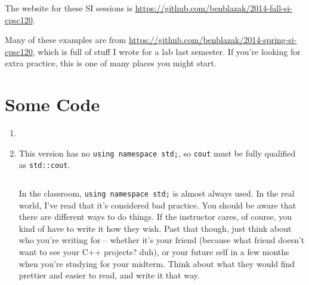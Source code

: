 \documentclass[12pt,letterpaper]{article}
\begin{document}
\thispagestyle{firstpage}

The website for these SI sessions is
\url{https://github.com/benblazak/2014-fall-si-cpsc120}.

Many of these examples are from
\url{https://github.com/benblazak/2014-spring-si-cpsc120},
which is full of stuff I wrote for a lab last semester.  If you're looking for
extra practice, this is one of many places you might start.


\filbreak
\section*{Some Code}
\begin{enumerate}

  \filbreak \item
    \inputminted{cpp}{hello-world-01.cpp}


  \filbreak \item
    This version has no \texttt{using namespace std;}, so
    \texttt{cout} must be fully qualified as
    \texttt{std::cout}.

    \inputminted{cpp}{hello-world-02.cpp}

    In the classroom, \texttt{using namespace std;} is almost always
    used.  In the real world, I've read that it's considered bad practice.  You
    should be aware that there are different ways to do things.  If the
    instructor cares, of course, you kind of have to write it how they wish.
    Past that though, just think about who you're writing for -- whether it's
    your friend (because what friend doesn't want to see your C++ projects?
    duh), or your future self in a few months when you're studying for your
    midterm.  Think about what they would find prettier and easier to read, and
    write it that way.


% 


% 



\end{enumerate}
\end{document}
